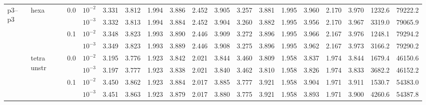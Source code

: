 \begin{longtable}{llclrrrrrrrrrrrrrr}
\multirow{8}{*}{p3--p3} & \multirow{4}{*}{hexa} & \multirow{2}{*}{0.0} & $10^{-2}$ & 3.331 & 3.812 & 1.994 & 3.886 & 2.452 & 3.905 & 3.257 & 3.881 & 1.995 & 3.960 & 2.170 & 3.970 & 1232.6 & 79222.2 \\
& & & $10^{-3}$ & 3.332 & 3.813 & 1.994 & 3.884 & 2.452 & 3.904 & 3.260 & 3.882 & 1.995 & 3.956 & 2.170 & 3.967 & 3319.0 & 79065.9 \\\cline{3-18}
& & \multirow{2}{*}{0.1} & $10^{-2}$ & 3.348 & 3.823 & 1.993 & 3.890 & 2.446 & 3.909 & 3.272 & 3.896 & 1.995 & 3.966 & 2.167 & 3.976 & 1248.1 & 79294.2 \\
& & & $10^{-3}$ & 3.349 & 3.823 & 1.993 & 3.889 & 2.446 & 3.908 & 3.275 & 3.896 & 1.995 & 3.962 & 2.167 & 3.973 & 3166.2 & 79290.2 \\\cline{2-18}
& \multirow{4}{*}{tetra unstr} & \multirow{2}{*}{0.0} & $10^{-2}$ & 3.195 & 3.776 & 1.923 & 3.842 & 2.021 & 3.844 & 3.460 & 3.809 & 1.958 & 3.837 & 1.974 & 3.844 & 1679.4 & 46150.6 \\
& & & $10^{-3}$ & 3.197 & 3.777 & 1.923 & 3.838 & 2.021 & 3.840 & 3.462 & 3.810 & 1.958 & 3.826 & 1.974 & 3.833 & 3682.2 & 46152.2 \\\cline{3-18}
& & \multirow{2}{*}{0.1} & $10^{-2}$ & 3.450 & 3.862 & 1.923 & 3.884 & 2.017 & 3.885 & 3.777 & 3.921 & 1.958 & 3.904 & 1.971 & 3.911 & 1530.7 & 54383.0 \\
& & & $10^{-3}$ & 3.451 & 3.863 & 1.923 & 3.879 & 2.017 & 3.880 & 3.775 & 3.921 & 1.958 & 3.893 & 1.971 & 3.900 & 4260.6 & 54387.8 \\\hline

\bottomrule
\end{longtable}
\normalsize
